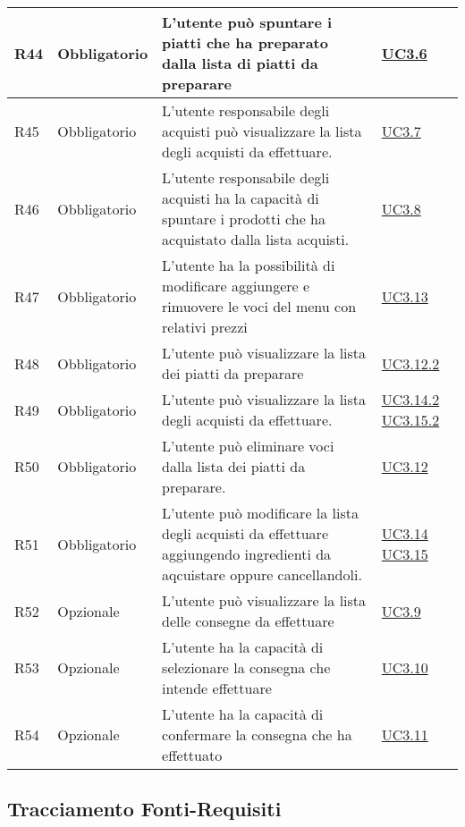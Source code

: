 \begin{longtable}{|P{1.5cm}|P{3cm}|P{6cm}|P{2.5cm}|}
	\hline R44 & Obbligatorio & L’utente  può spuntare i piatti che ha preparato dalla lista di piatti da preparare  & \hyperref[UC3.6]{UC3.6} \\
	\hline R45 & Obbligatorio & L’utente responsabile degli acquisti può visualizzare la lista degli acquisti da effettuare. & \hyperref[UC3.7]{UC3.7} \\
	\hline R46 & Obbligatorio & L’utente responsabile degli acquisti ha la capacità di spuntare i prodotti che ha acquistato dalla lista acquisti.
	 & \hyperref[UC3.8]{UC3.8} \\
	\hline R47 & Obbligatorio & L’utente  ha la possibilità di modificare aggiungere e rimuovere le voci del menu con relativi prezzi & \hyperref[UC3.13]{UC3.13} \\
	\hline R48 & Obbligatorio & L’utente  può visualizzare la lista dei piatti da preparare & \hyperref[UC3.12.2]{UC3.12.2} \\
	\hline R49 & Obbligatorio & L’utente  può visualizzare la lista degli acquisti da effettuare. & \hyperref[UC3.14.2]{UC3.14.2} \hyperref[UC3.15.2]{UC3.15.2} \\
	\hline R50 & Obbligatorio & L’utente  può eliminare voci dalla lista dei piatti da preparare. & \hyperref[UC3.12]{UC3.12} \\
	\hline R51 & Obbligatorio & L’utente  può modificare la lista degli acquisti da effettuare aggiungendo ingredienti da aqcuistare oppure cancellandoli.
	 & \hyperref[UC3.14]{UC3.14} \linebreak \hyperref[UC3.15]{UC3.15} \\	 
	\hline R52 & Opzionale & L’utente  può visualizzare la lista delle consegne da effettuare & \hyperref[UC3.9]{UC3.9} \\
	\hline R53 & Opzionale & L’utente  ha la capacità di selezionare la consegna che intende effettuare & \hyperref[UC3.10]{UC3.10} \\
	\hline R54 & Opzionale & L’utente  ha la capacità di confermare la consegna che ha effettuato & \hyperref[UC3.11]{UC3.11} \\
	\hline
\end{longtable}

\subsection{Tracciamento Fonti-Requisiti}


